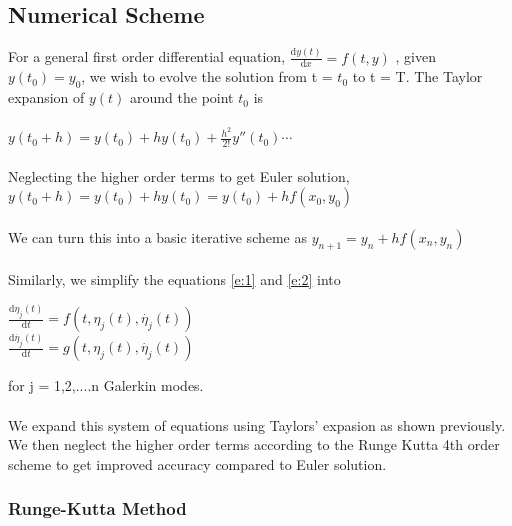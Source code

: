 \documentclass[8pt]{article} %
\begin{document}
\subsection{Numerical Scheme}
For a general first order differential equation, $\frac{\mathrm{d} y(t)}{\mathrm{d} x} = f(t,y)$ , given $y(t_0) = y_0$, we wish to evolve the solution from t = $t_0$ to t = T.
The Taylor expansion of $y(t)$ around the point $t_0$ is\\\\
$y(t_0 + h) = y(t_0) + h y(t_0) + \frac{h^2}{2!} y''(t_0) \cdots$ \\\\
Neglecting the higher order terms to get Euler solution, $y(t_0 + h) = y(t_0) + h y(t_0) = y(t_0) + h f(x_0,y_0) $ \\\\
We can turn this into a basic iterative scheme as 
$y_{n+1} = y_n + h f(x_n,y_n)$ \\\\
Similarly, we simplify the equations \eqref{e:1} and \eqref{e:2} into\\
\begin{center}
$\frac{\mathrm{d} \eta_j (t)}{\mathrm{d} t} = f(t,\eta_j (t),\dot{\eta_j}(t))$\\
$\frac{\mathrm{d} \dot{\eta_j}(t)}{\mathrm{d} t} = g(t,\eta_j (t),\dot{\eta_j}(t))$
\end{center}
for j = 1,2,....n Galerkin modes.\\\\
We expand this system of equations using Taylors' expasion as shown previously. We then neglect the higher order terms according to the Runge Kutta 4th order scheme to get improved accuracy compared to Euler solution.

\subsubsection{Runge-Kutta Method}
\end{document}
